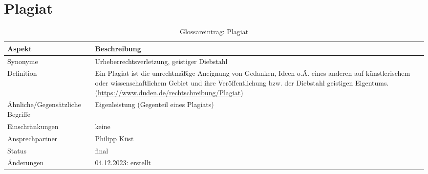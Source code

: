 \section{Plagiat}\label{sec:glossar_plagiat}
\begin{table}[H]
    \label{tab:glossar_plagiat}
    \begin{tabularx}{\textwidth}{|l|X|}
        \hline
        \textbf{Aspekt}                  & \textbf{Beschreibung}                        \\
        \hline
        Synonyme                         & Urheberrechtsverletzung, geistiger Diebstahl \\
        \hline
        Definition & Ein Plagiat ist die unrechtmäßige Aneignung von Gedanken, Ideen o.Ä. eines anderen auf künstlerischem oder wissenschaftlichem Gebiet und ihre Veröffentlichung bzw. der Diebstahl geistigen Eigentums.
        (\url{https://www.duden.de/rechtschreibung/Plagiat}) \\
        \hline
        Ähnliche/Gegensätzliche Begriffe & Eigenleistung (Gegenteil eines Plagiats)     \\
        \hline
        Einschränkungen                  & keine                                        \\
        \hline
        Ansprechpartner                  & Philipp Küst                                 \\
        \hline
        Status                           & final                                        \\
        \hline
        Änderungen                       & 04.12.2023: erstellt                         \\
        \hline
    \end{tabularx}
    \caption{Glossareintrag: Plagiat}
\end{table}


